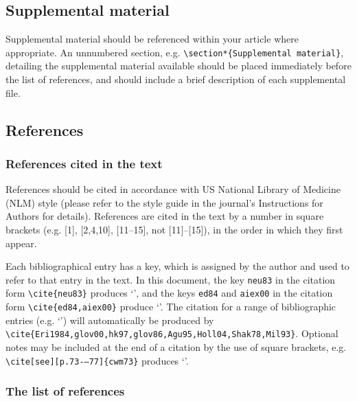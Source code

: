 \documentclass{gAPA2e}
\theoremstyle{plain}
\theoremstyle{remark}
\theoremstyle{definition}
\begin{document}
\subsection{Supplemental material}

Supplemental material should be referenced within your article where appropriate. An unnumbered section, e.g. \verb"\section*{Supplemental material}", detailing the supplemental material available should be placed immediately before the list of references, and should include a brief description of each supplemental file.


\subsection{References}\label{refs}

\subsubsection{References cited in the text}

References should be cited in accordance with US National Library of Medicine (NLM) style (please refer to the style guide in the journal's Instructions for Authors for details). References are cited in the text by a number in square brackets (e.g. [1], [2,4,10], [11--15], not [11]--[15]), in the order in which they first appear.

Each bibliographical entry has a key, which is assigned by the author and used to refer to that entry in the text. In this document, the key \verb"neu83" in the citation form
\verb"\cite{neu83}" produces `\cite{neu83}', and the keys \verb"ed84" and \verb"aiex00" in the citation form
\verb"\cite{ed84,aiex00}" produce `\cite{ed84,aiex00}'. The citation for a range of bibliographic entries (e.g.
`\cite{Eri1984,glov00,hk97,glov86,Agu95,Holl04,Shak78,Mil93}') will automatically be produced by
\verb"\cite{Eri1984,glov00,hk97,glov86,Agu95,Holl04,Shak78,Mil93}". Optional notes may be included at the end of a citation by the use of square brackets, e.g. \verb"\cite[see][p.73-–77]{cwm73}" produces `\cite[see][p.73--77]{cwm73}'.

\subsubsection{The list of references}
\end{document}
